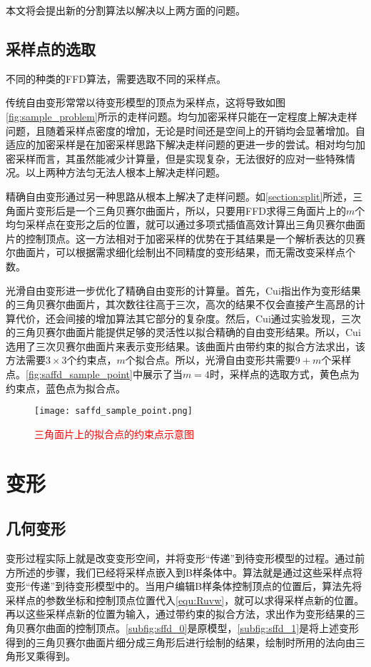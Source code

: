 本文将会提出新的分割算法以解决以上两方面的问题。

\subsection{采样点的选取}
不同的种类的FFD算法，需要选取不同的采样点。

传统自由变形常常以待变形模型的顶点为采样点，这将导致如图\autoref{fig:sample_problem}所示的走样问题。均匀加密采样只能在一定程度上解决走样问题，且随着采样点密度的增加，无论是时间还是空间上的开销均会显著增加。自适应的加密采样是在加密采样思路下解决走样问题的更进一步的尝试。相对均匀加密采样而言，其虽然能减少计算量，但是实现复杂，无法很好的应对一些特殊情况。以上两种方法匀无法人根本上解决走样问题。

精确自由变形\cite{Feng00}通过另一种思路从根本上解决了走样问题。如\ref{section:split}所述，三角面片变形后是一个三角贝赛尔曲面片，所以，只要用FFD求得三角面片上的$m$个均匀采样点在变形之后的位置，就可以通过多项式插值高效计算出三角贝赛尔曲面片的控制顶点。这一方法相对于加密采样的优势在于其结果是一个解析表达的贝赛尔曲面片，可以根据需求细化绘制出不同精度的变形结果，而无需改变采样点个数。

光滑自由变形\cite{Cui15}进一步优化了精确自由变形的计算量。首先，Cui指出作为变形结果的三角贝赛尔曲面片，其次数往往高于三次，高次的结果不仅会直接产生高昂的计算代价，还会间接的增加算法其它部分的复杂度。然后，Cui通过实验发现，三次的三角贝赛尔曲面片能提供足够的灵活性以拟合精确的自由变形结果。所以，Cui选用了三次贝赛尔曲面片来表示变形结果。该曲面片由带约束的拟合方法求出，该方法需要$3\times3$个约束点，$m$个拟合点。所以，光滑自由变形共需要$9+m$个采样点。\autoref{fig:saffd_sample_point}中展示了当$m=4$时，采样点的选取方式，黄色点为约束点，蓝色点为拟合点。

\begin{figure}[htbp]
	\centering
	\texttt{[image: saffd\_sample\_point.png]}
    \caption{\textcolor{red}{三角面片上的拟合点的约束点示意图}}\label{fig:saffd_sample_point}
\end{figure}


\section{变形}
\subsection{几何变形}
变形过程实际上就是改变变形空间，并将变形“传递”到待变形模型的过程。通过前方所述的步骤，我们已经将采样点嵌入到B样条体中。算法就是通过这些采样点将变形“传递”到待变形模型中的。当用户编辑B样条体控制顶点的位置后，算法先将采样点的参数坐标和控制顶点位置代入\autoref{equ:Ruvw}，就可以求得采样点新的位置。再以这些采样点新的位置为输入，通过带约束的拟合方法，求出作为变形结果的三角贝赛尔曲面的控制顶点。\autoref{subfig:sffd_0}是原模型，\autoref{subfig:sffd_1}是将上述变形得到的三角贝赛尔曲面片细分成三角形后进行绘制的结果，绘制时所用的法向由三角形叉乘得到。

